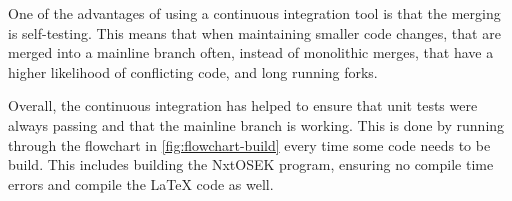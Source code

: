 One of the advantages of using a continuous integration tool is that the merging is self-testing.
This means that when maintaining smaller code changes, that are merged into a mainline branch often, instead of monolithic merges, that have a higher likelihood of conflicting code, and long running forks.

Overall, the continuous integration has helped to ensure that unit tests were always passing and that the mainline branch is working.
This is done by running through the flowchart in \autoref{fig:flowchart-build} every time some code needs to be build.
This includes building the NxtOSEK program, ensuring no compile time errors and compile the \LaTeX{} code as well.
